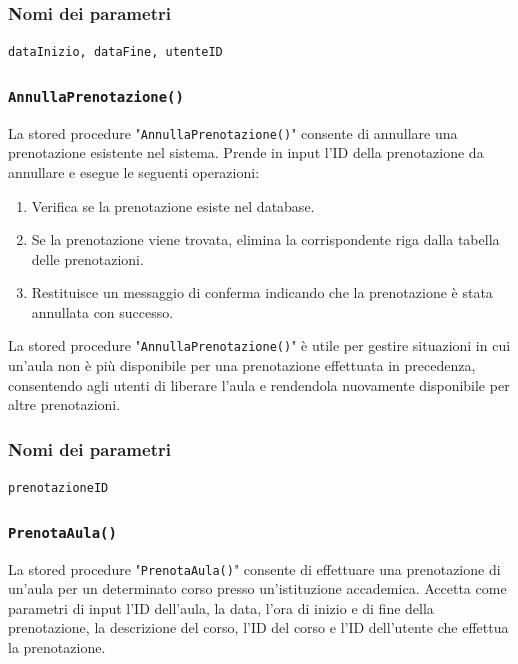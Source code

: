 \documentclass[a4paper, 10pt, oneside]{article} %
\begin{document}
\subsubsection*{Nomi dei parametri}

\texttt{dataInizio, dataFine, utenteID}


\subsubsection*{\texttt{AnnullaPrenotazione()}}

La stored procedure "\texttt{AnnullaPrenotazione()}" consente di annullare una prenotazione esistente nel sistema. Prende in input l'ID della prenotazione da annullare e esegue le seguenti operazioni:

\begin{enumerate}
    \item Verifica se la prenotazione esiste nel database.
    \item Se la prenotazione viene trovata, elimina la corrispondente riga dalla tabella delle prenotazioni.
    \item Restituisce un messaggio di conferma indicando che la prenotazione è stata annullata con successo.

\end{enumerate}

La stored procedure "\texttt{AnnullaPrenotazione()}" è utile per gestire situazioni in cui un'aula non è più disponibile per una prenotazione effettuata in precedenza, consentendo agli utenti di liberare l'aula e rendendola nuovamente disponibile per altre prenotazioni.


\subsubsection*{Nomi dei parametri}

\texttt{prenotazioneID}

\subsubsection*{\texttt{PrenotaAula()}}

La stored procedure "\texttt{PrenotaAula()}" consente di effettuare una prenotazione di un'aula per un determinato corso presso un'istituzione accademica. Accetta come parametri di input l'ID dell'aula, la data, l'ora di inizio e di fine della prenotazione, la descrizione del corso, l'ID del corso e l'ID dell'utente che effettua la prenotazione.\\
\end{document}
